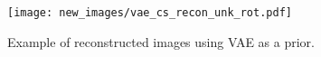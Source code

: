 \begin{figure}[!h]
    \centering
    \texttt{[image: new\_images/vae\_cs\_recon\_unk\_rot.pdf]}\hfill
    \caption{Example of reconstructed images using VAE as a prior.}
    \label{fig:mayo_vae_rec_unk}
\end{figure}